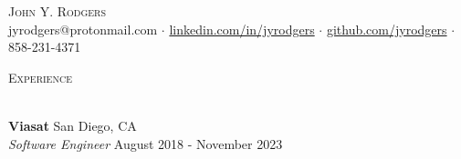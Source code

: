 \documentclass[a4paper]{article}
\newcommand{\lineunder} {
    \vspace*{-8pt} \\
    \hspace*{-18pt} \hrulefill \\
}
\newcommand{\header} [1] {
    {\hspace*{-18pt}\vspace*{6pt} \textsc{#1}}
    \vspace*{-6pt} \lineunder
}
\begin{document}
\vspace*{-40pt}



\vspace*{-10pt}
\begin{center}
	{\Huge \scshape {John Y. Rodgers}}\\
	jyrodgers@protonmail.com $\cdot$ \href{https://www.linkedin.com/in/jyrodgers/}{linkedin.com/in/jyrodgers} $\cdot$ \href{https://github.com/jyrodgers}{github.com/jyrodgers} $\cdot$  858-231-4371 \\
\end{center}

\header{Experience}
\vspace{1mm}

\textbf{Viasat} \hfill San Diego, CA\\
\textit{Software Engineer} \hfill August 2018 - November 2023\\
\vspace{1mm}
\end{document}
